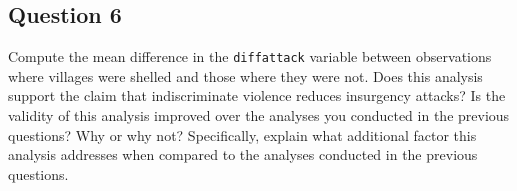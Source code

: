 \documentclass[]{article}
\begin{document}
\subsection{Question 6}\label{question-6}

Compute the mean difference in the \texttt{diffattack} variable between
observations where villages were shelled and those where they were not.
Does this analysis support the claim that indiscriminate violence
reduces insurgency attacks? Is the validity of this analysis improved
over the analyses you conducted in the previous questions? Why or why
not? Specifically, explain what additional factor this analysis
addresses when compared to the analyses conducted in the previous
questions.
\end{document}

